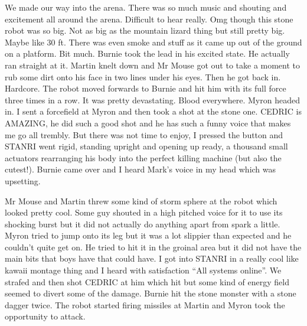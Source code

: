 We made our way into the arena. There was so much music and shouting and excitement all around the arena. Difficult to hear really. Omg though this stone robot was so big. Not as big as the mountain lizard thing but still pretty big. Maybe like 30 ft. There was even smoke and stuff as it came up out of the ground on a platform. Bit much. Burnie took the lead in his excited state. He actually ran straight at it. Martin knelt down and Mr Mouse got out to take a moment to rub some dirt onto his face in two lines under his eyes. Then he got back in. Hardcore. The robot moved forwards to Burnie and hit him with its full force three times in a row. It was pretty devastating. Blood everywhere. Myron headed in. I sent a forcefield at Myron and then took a shot at the stone one. CEDRIC is AMAZING, he did such a good shot and he has such a funny voice that makes me go all trembly. But there was not time to enjoy, I pressed the button and STANRI went rigid, standing upright and opening up ready, a thousand small actuators rearranging his body into the perfect killing machine (but also the cutest!). Burnie came over and I heard Mark’s voice in my head which was upsetting.\medskip

Mr Mouse and Martin threw some kind of storm sphere at the robot which looked pretty cool. Some guy shouted in a high pitched voice for it to use its shocking burst but it did not actually do anything apart from spark a little. Myron tried to jump onto its leg but it was a lot slippier than expected and he couldn’t quite get on. He tried to hit it in the groinal area but it did not have the main bits that boys have that could have. I got into STANRI in a really cool like kawaii montage thing and I heard with satisfaction “All systems online”. We strafed and then shot CEDRIC at him which hit but some kind of energy field seemed to divert some of the damage. Burnie hit the stone monster with a stone dagger twice. The robot started firing missiles at Martin and Myron took the opportunity to attack.\medskip


